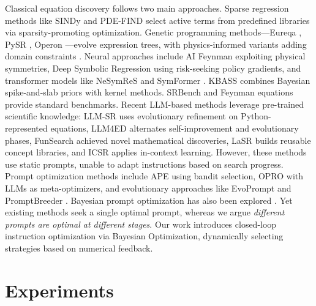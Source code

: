 \documentclass[twoside,11pt]{article}
\let\cite\citep
\newcommand{\1}{{\bf 1}}
\newcommand{\0}{{\bf 0}}
\begin{document}
Classical equation discovery follows two main approaches. Sparse regression methods like SINDy \cite{brunton2016sindy,messenger2021weak,fasel2022ensemble} and PDE-FIND \cite{rudy2017pdefind} select active terms from predefined libraries via sparsity-promoting optimization. Genetic programming methods—Eureqa \cite{schmidt2009eureqa}, PySR \cite{cranmer2023pysr}, Operon \cite{burlacu2020operon}—evolve expression trees, with physics-informed variants adding domain constraints \cite{zhang2024pigp}. Neural approaches include AI Feynman \cite{udrescu2020aifeynman,udrescu2020aifeynman2,kamienny2022e2e,mundhenk2021seeding,landajuela2022udsr} exploiting physical symmetries, Deep Symbolic Regression \cite{petersen2021dsr} using risk-seeking policy gradients, and transformer models like NeSymReS \cite{biggio2021nesymres} and SymFormer \cite{vastl2022symformer}. KBASS \cite{long2023kbass} combines Bayesian spike-and-slab priors with kernel methods. SRBench \cite{lacava2021srbench} and Feynman equations \cite{udrescu2020aifeynman} provide standard benchmarks. Recent LLM-based methods leverage pre-trained scientific knowledge: LLM-SR \cite{shojaee2024llmsr,boiko2023coscientist,ma2024sga,zhang2024chemllm} uses evolutionary refinement on Python-represented equations, LLM4ED \cite{du2024llm4ed} alternates self-improvement and evolutionary phases, FunSearch \cite{romera2024funsearch} achieved novel mathematical discoveries, LaSR \cite{grayeli2024lasr} builds reusable concept libraries, and ICSR \cite{merler2024icsr} applies in-context learning. However, these methods use static prompts, unable to adapt instructions based on search progress. Prompt optimization methods include APE \cite{zhou2023ape} using bandit selection, OPRO \cite{yang2024opro} with LLMs as meta-optimizers, and evolutionary approaches like EvoPrompt \cite{guo2024evoprompt} and PromptBreeder \cite{fernando2024promptbreeder}. Bayesian prompt optimization has also been explored \cite{sabbatella2024promptbo}. Yet existing methods seek a single optimal prompt, whereas we argue \textit{different prompts are optimal at different stages}. Our work introduces closed-loop instruction optimization via Bayesian Optimization, dynamically selecting strategies based on numerical feedback.







\section{Experiments}
\label{sec:experiments}
\end{document}
